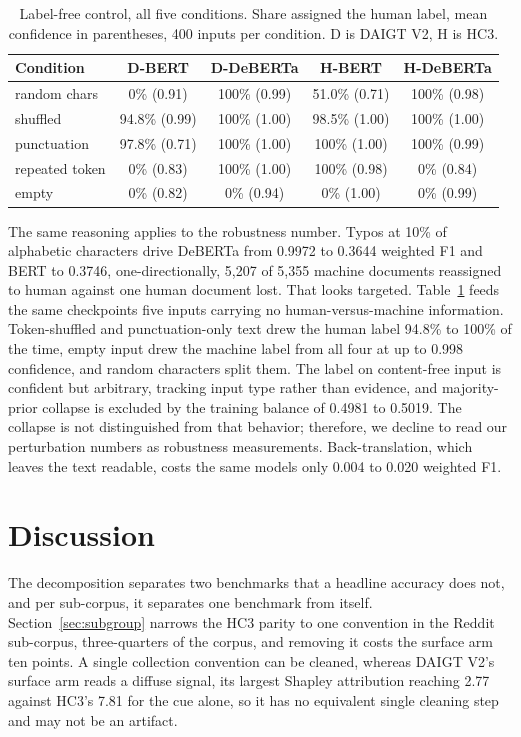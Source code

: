 \documentclass[conference,a4paper]{IEEEtran}
\newcommand{\secref}[1]{\hyperref[#1]{\ref*{#1}}}
\newcommand{\tabref}[1]{\hyperref[#1]{\ref*{#1}}}
\begin{document}
\begin{table}[!t]
\centering
\caption{Label-free control, all five conditions. Share assigned the human label, mean confidence in parentheses, 400 inputs per condition. D is DAIGT V2, H is HC3.}
\label{tab:labelfree}
\scriptsize
\setlength{\tabcolsep}{2.5pt}
\begin{tabular}{@{}lcccc@{}}
\toprule
Condition & D-BERT & D-DeBERTa & H-BERT & H-DeBERTa \\
\midrule
random chars & 0\% (0.91) & 100\% (0.99) & 51.0\% (0.71) & 100\% (0.98) \\
shuffled & 94.8\% (0.99) & 100\% (1.00) & 98.5\% (1.00) & 100\% (1.00) \\
punctuation & 97.8\% (0.71) & 100\% (1.00) & 100\% (1.00) & 100\% (0.99) \\
repeated token & 0\% (0.83) & 100\% (1.00) & 100\% (0.98) & 0\% (0.84) \\
empty & 0\% (0.82) & 0\% (0.94) & 0\% (1.00) & 0\% (0.99) \\
\bottomrule
\end{tabular}
\end{table}

The same reasoning applies to the robustness number. Typos at 10\% of alphabetic characters drive DeBERTa from 0.9972 to 0.3644 weighted F1 and BERT to 0.3746, one-directionally, 5,207 of 5,355 machine documents reassigned to human against one human document lost. That looks targeted. Table~\tabref{tab:labelfree} feeds the same checkpoints five inputs carrying no human-versus-machine information. Token-shuffled and punctuation-only text drew the human label 94.8\% to 100\% of the time, empty input drew the machine label from all four at up to 0.998 confidence, and random characters split them. The label on content-free input is confident but arbitrary, tracking input type rather than evidence, and majority-prior collapse is excluded by the training balance of 0.4981 to 0.5019. The collapse is not distinguished from that behavior; therefore, we decline to read our perturbation numbers as robustness measurements. Back-translation, which leaves the text readable, costs the same models only 0.004 to 0.020 weighted F1.

\section{Discussion}
\label{sec:discussion}

The decomposition separates two benchmarks that a headline accuracy does not, and per sub-corpus, it separates one benchmark from itself. Section~\secref{sec:subgroup} narrows the HC3 parity to one convention in the Reddit sub-corpus, three-quarters of the corpus, and removing it costs the surface arm ten points. A single collection convention can be cleaned, whereas DAIGT V2's surface arm reads a diffuse signal, its largest Shapley attribution reaching 2.77 against HC3's 7.81 for the cue alone, so it has no equivalent single cleaning step and may not be an artifact.
\end{document}

